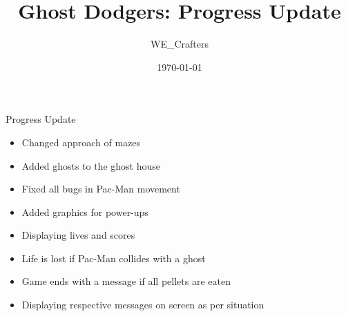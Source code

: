 \documentclass{beamer}
\title{Ghost Dodgers: Progress Update}
\author{WE\_Crafters}
\date{\today}
\begin{document}
\frame{\titlepage}

\begin{frame}{Progress Update}
\begin{itemize}
    \item Changed approach of mazes
    \item Added ghosts to the ghost house
    \item Fixed all bugs in Pac-Man movement
    \item Added graphics for power-ups
    \item Displaying lives and scores
    \item Life is lost if Pac-Man collides with a ghost
    \item Game ends with a message if all pellets are eaten
    \item Displaying respective messages on screen as per situation
\end{itemize}
\end{frame}
\end{document}

